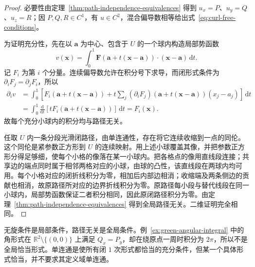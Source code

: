 \begin{proof}
必要性由定理~\ref{thm:path-independence-equivalences} 得到 $u_x=P$、$u_y=Q$、$u_z=R$；因 $P,Q,R\in C^1$，有 $u\in C^2$，混合偏导数相等给出式~\eqref{eq:curl-free-conditions}。

为证明充分性，先在以 $\boldsymbol a$ 为中心、包含于 $U$ 的一个球内构造局部势函数
\[
    v(\boldsymbol x)=\int_0^1
    \boldsymbol F(\boldsymbol a+t(\boldsymbol x-\boldsymbol a))
    \cdot(\boldsymbol x-\boldsymbol a)\,\mathrm dt.
\]
记 $F_i$ 为第 $i$ 个分量。连续偏导数允许在积分号下求导，而闭形式条件为 $\partial_iF_j=\partial_jF_i$，所以
\begin{align*}
    \partial_i v
    &=\int_0^1\left[F_i(\boldsymbol a+t(\boldsymbol x-\boldsymbol a))
      +t\sum_j(\partial_iF_j)(\boldsymbol a+t(\boldsymbol x-\boldsymbol a))(x_j-a_j)\right]\,\mathrm dt\\
    &=\int_0^1\frac{\mathrm d}{\mathrm dt}
      \left[tF_i(\boldsymbol a+t(\boldsymbol x-\boldsymbol a))\right]\,\mathrm dt
      =F_i(\boldsymbol x).
\end{align*}
故每个充分小球内的积分均与路径无关。

任取 $U$ 内一条分段光滑闭路径，由单连通性，存在将它连续收缩到一点的同伦。这个同伦是紧参数正方形到 $U$ 的连续映射。用上述小球覆盖其像，并把参数正方形分得足够细，使每个小格的像落在某一小球内。把各格点的像用直线段连接；共享边的端点同时属于相邻两格对应的小球，由球的凸性，该直线段在两球内均可用。每个小格对应的闭折线积分为零，相加后内部边相消；收缩端及两条侧边的贡献也相消，故原路径所对应的边界折线积分为零。原路径每小段与替代线段在同一小球内，局部势函数保证二者积分相同，因此原闭路径积分为零。由定理~\ref{thm:path-independence-equivalences} 得到全局路径无关。二维证明完全相同。
\end{proof}

\begin{notealert}[type=caution,title={局部微分条件与全局结论}]
无旋条件是局部条件，路径无关是全局条件。例~\ref{ex:green-angular-integral} 中的角形式在 $\mathbb R^2\setminus\{(0,0)\}$ 上满足 $Q_x=P_y$，却在绕原点一周时积分为 $2\pi$，所以不是全局恰当形式。单连通是使所有闭 $1$ 次形式都恰当的充分条件，但某一个具体形式恰当，并不要求其定义域单连通。
\end{notealert}

